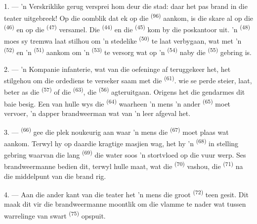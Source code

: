 1. --- 'n Verskriklike gerug versprei hom deur die stad: daar het pas brand in die teater
uitgebreek! Op die oomblik dat ek op die  \textsuperscript{(96)} aankom, is
die skare al op die  \textsuperscript{(46)} en op die 
\textsuperscript{(47)} versamel. Die  \textsuperscript{(44)} en die
 \textsuperscript{(45)} kom by die poskantoor uit. 'n
 \textsuperscript{(48)} moes sy tremwa laat stilhou om 'n
stedelike  \textsuperscript{(50)} te laat verbygaan, wat met 'n
 \textsuperscript{(52)} en 'n  \textsuperscript{(51)}
aankom om 'n  \textsuperscript{(53)} te versorg wat op 'n
 \textsuperscript{(54)} naby die 
\textsuperscript{(55)} gebring is.

2. --- 'n Kompanie infanterie, wat van die oefeninge af teruggekeer het, het stilgehou om
die ordediens te verseker saam met die 
\textsuperscript{(61)}.  wie se perde steier, laat, beter as die 
\textsuperscript{(57)} of die  \textsuperscript{(63)}, die
 \textsuperscript{(56)} agteruitgaan. Origens het die
gendarmes dit baie besig. Een van hulle wys die 
\textsuperscript{(64)} waarheen 'n mens 'n ander  \textsuperscript{(65)}
moet vervoer, 'n dapper brandweerman wat van 'n leer afgeval het.

3. ---  \textsuperscript{(66)} gee die plek noukeurig aan waar 'n
mens die  \textsuperscript{(67)} moet plaas wat aankom. Terwyl hy op
daardie kragtige masjien wag, het hy 'n  \textsuperscript{(68)} in
stelling gebring waarvan die lang  \textsuperscript{(69)} die water soos 'n
stortvloed op die vuur werp. Ses brandweermanne bedien dit, terwyl hulle maat, wat die
 \textsuperscript{(70)} vashou, die 
\textsuperscript{(71)} na die middelpunt van die brand rig.

4. --- Aan die ander kant van die teater het 'n mens die groot 
\textsuperscript{(72)} teen gesit. Dit maak dit vir die brandweermanne moontlik om die
vlamme te nader wat tussen warrelinge van swart  \textsuperscript{(75)}
opspuit.

\VUsaut{5.0mm}
\VUsaut{3.4mm}

